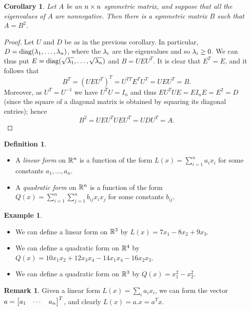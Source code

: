 \documentclass[reqno]{amsart}
\newtheorem{corollary}[theorem]{Corollary}
\theoremstyle{definition}
\newtheorem{remark}[theorem]{Remark}
\newtheorem{definition}[theorem]{Definition}
\newtheorem{example}[theorem]{Example}
\newcommand{\dfn}[1]{\emph{{#1}}\index{#1}}
\begin{document}
\begin{corollary}\label{cor-square-root}
 Let $A$ be an $n\times n$ symmetric matrix, and suppose that all the
 eigenvalues of $A$ are nonnegative.  Then there is a symmetric matrix
 $B$ such that $A=B^2$.
\end{corollary}
\begin{proof}
 Let $U$ and $D$ be as in the previous corollary.  In particular,
 $D=\operatorname{diag}(\lambda_1,\dotsc,\lambda_n)$, where the $\lambda_i$ are the eigenvalues
 and so $\lambda_i\geq 0$.  We can thus put
 $E=\operatorname{diag}(\sqrt{\lambda_1},\dotsc,\sqrt{\lambda_n})$ and $B=UEU^T$.  It is
 clear that $E^T=E$, and it follows that 
 \[ B^T = (UEU^T)^T = U^{TT}E^TU^T = UEU^T = B. \]
 Moreover, as $U^T=U^{-1}$ we have $U^TU=I_n$ and
 thus $E U^T U E = E I_n E = E^2 = D$ (since the square of a
 diagonal matrix is obtained by squaring its diagonal entries); hence
 \[ B^2 = UEU^TUEU^T = UDU^T = A. \]
\end{proof}

\begin{definition}\label{defn-forms}
 \begin{itemize}
  \item[(a)] A \dfn{linear form} on ${\mathbb{R}}^n$ is a function of the form
   $L(x)=\sum_{i=1}^n a_ix_i$ for some constants
   $a_1,\dotsc,a_n$. 
  \item[(b)] A \dfn{quadratic form} on ${\mathbb{R}}^n$ is a function of the
   form $Q(x)=\sum_{i=1}^n\sum_{j=1}^nb_{ij}x_ix_j$ for
   some constants $b_{ij}$. 
 \end{itemize}
\end{definition}

\begin{example}\label{eg-forms}
 \begin{itemize}
  \item[(a)] We can define a linear form on ${\mathbb{R}}^3$ by
   $L(x)=7x_1-8x_2+9x_3$. 
  \item[(b)] We can define a quadratic form on ${\mathbb{R}}^4$ by 
   $Q(x)=10 x_1x_2 + 12 x_3x_4 - 14 x_1x_4 - 16 x_2x_3$.
  \item[(c)] We can define a quadratic form on ${\mathbb{R}}^3$ by 
   $Q(x)= x_1^2 - x_2^2$.
 \end{itemize}
\end{example}

\begin{remark}
 Given a linear form $L(x)=\sum_ia_ix_i$, we can form the vector
 $a=\left[\begin{matrix} a_1 & \cdots & a_n\end{matrix}\right]^T$, and clearly $L(x)=a.x=a^Tx$.  
\end{remark}
\end{document}
